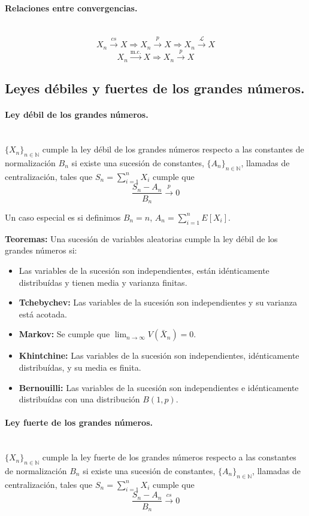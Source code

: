 \documentclass[oneside,spanish,a4paper]{article}
\newcommand{\subsectioncol}[1]{\subsection{{\color{red} #1}}}
\begin{document}
\paragraph{Relaciones entre convergencias.}

~\\
\[X_n\overset{cs}{\to}X\Rightarrow X_n\overset{p}{\to}X\Rightarrow X_n\overset{\mathcal{L}}{\to}X\]
\[X_n\overset{\text{m.c.}}{\to}X\Rightarrow X_n\overset{p}{\to}X\]

\subsectioncol{Leyes d\'ebiles y fuertes de los grandes n\'umeros.}

\paragraph{Ley d\'ebil de los grandes n\'umeros.}
~\\
$\{X_n\}_{n\in \mathbb{N}}$ cumple la ley d\'ebil de los grandes n\'umeros respecto a las constantes de normalizaci\'on $B_n$ si existe una sucesi\'on de constantes, $\{A_n\}_{n\in \mathbb{N}}$, llamadas de centralizaci\'on, tales que $S_n=\sum_{i=1}^nX_i$ cumple que
\[\dfrac{S_n-A_n}{B_n}\overset{p}{\to}0\]

Un caso especial es si definimos $B_n=n$, $A_n=\sum_{i=1}^nE[X_i]$.

\textbf{Teoremas:} Una sucesi\'on de variables aleatorias cumple la ley d\'ebil de los grandes n\'umeros si:
\begin{itemize}
\item Las variables de la sucesi\'on son independientes, est\'an id\'enticamente distribuídas y tienen media y varianza finitas.
\item \textbf{Tchebychev:} Las variables de la sucesi\'on son independientes y su varianza est\'a acotada.
\item \textbf{Markov:} Se cumple que $\lim_{n\to\infty}V(\bar{X}_n)=0$.
\item \textbf{Khintchine:} Las variables de la sucesi\'on son independientes, id\'enticamente distribu\'idas, y su media es finita.
\item \textbf{Bernouilli:} Las variables de la sucesi\'on son independientes e id\'enticamente distribu\'idas con una distribuci\'on $B(1,p)$.
\end{itemize}

\paragraph{Ley fuerte de los grandes n\'umeros.}
~\\
$\{X_n\}_{n\in \mathbb{N}}$ cumple la ley fuerte de los grandes n\'umeros respecto a las constantes de normalizaci\'on $B_n$ si existe una sucesi\'on de constantes, $\{A_n\}_{n\in \mathbb{N}}$, llamadas de centralizaci\'on, tales que $S_n=\sum_{i=1}^nX_i$ cumple que
\[\dfrac{S_n-A_n}{B_n}\overset{cs}{\to}0\]
\end{document}
